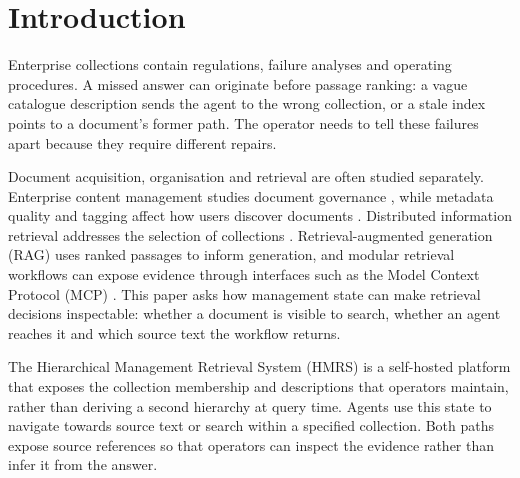 \section{Introduction}
\label{sec:intro}

Enterprise collections contain regulations, failure analyses and operating
procedures. A missed answer can originate before passage ranking: a vague
catalogue description sends the agent to the wrong collection, or a stale
index points to a document's former path. The operator needs to tell these
failures apart because they require different repairs.

Document acquisition, organisation and retrieval are often studied
separately. Enterprise content management studies document
governance \cite{paivarinta-ecm-2005,tyrvaainen-ecm-2006}, while metadata
quality and tagging affect how users discover documents
\cite{park-metadata-quality-2009,golder-tagging-2006}. Distributed
information retrieval addresses the selection of collections
\cite{callan1995searching,si2003redde}. Retrieval-augmented generation
(RAG) uses ranked passages to inform generation, and modular retrieval
workflows can expose evidence through interfaces such as the Model
Context Protocol (MCP) \cite{rag-lewis,dpr,modular-rag,mcp,gao-rag-survey-2023}.
This paper asks how management state can make retrieval decisions
inspectable: whether a document is visible to search, whether an agent
reaches it and which source text the workflow returns.

The Hierarchical Management Retrieval System (HMRS) is a self-hosted
platform that exposes the collection membership and descriptions that
operators maintain, rather than deriving a second hierarchy at query time.
Agents use this state to navigate towards source text or search within a
specified collection. Both paths expose source references so that
operators can inspect the evidence rather than infer it from the answer.

